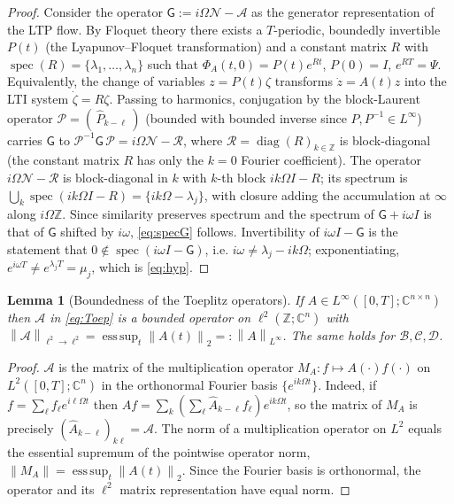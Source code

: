 \documentclass{amsart}
\newtheorem{lemma}{Lemma}
\theoremstyle{definition}
\DeclareMathOperator{\spec}{spec}
\DeclareMathOperator{\diag}{diag}
\newcommand{\C}{\mathbb{C}}
\newcommand{\Z}{\mathbb{Z}}
\newcommand{\norm}[1]{\left\lVert#1\right\rVert}
\newcommand{\Acal}{\mathcal{A}}
\newcommand{\Bcal}{\mathcal{B}}
\newcommand{\Ccal}{\mathcal{C}}
\newcommand{\Dcal}{\mathcal{D}}
\newcommand{\Ncal}{\mathcal{N}}
\begin{document}
\begin{proof}
Consider the operator $\mathsf G:=i\Omega\Ncal-\Acal$ as the generator
representation of the LTP flow. By Floquet theory there exists a $T$-periodic,
boundedly invertible $P(t)$ (the Lyapunov–Floquet transformation) and a
constant matrix $R$ with $\spec(R)=\{\lambda_1,\dots,\lambda_n\}$ such that
$\Phi_A(t,0)=P(t)e^{Rt}$, $P(0)=I$, $e^{RT}=\Psi$. Equivalently, the change of
variables $z=P(t)\zeta$ transforms $\dot z=A(t)z$ into the LTI system
$\dot\zeta=R\zeta$. Passing to harmonics, conjugation by the block-Laurent
operator $\mathcal P=(\,\hat P_{k-\ell}\,)$ (bounded with bounded inverse since
$P,P^{-1}\in L^\infty$) carries $\mathsf G$ to
$\mathcal P^{-1}\mathsf G\,\mathcal P=i\Omega\Ncal-\mathcal R$, where
$\mathcal R=\diag(R)_{k\in\Z}$ is block-diagonal (the constant matrix $R$ has
only the $k=0$ Fourier coefficient). The operator $i\Omega\Ncal-\mathcal R$ is
block-diagonal in $k$ with $k$-th block $ik\Omega I-R$; its spectrum is
$\bigcup_k\spec(ik\Omega I-R)=\{ik\Omega-\lambda_j\}$, with closure adding the
accumulation at $\infty$ along $i\Omega\Z$. Since similarity preserves spectrum
and the spectrum of $\mathsf G+i\omega I$ is that of $\mathsf G$ shifted by
$i\omega$, \eqref{eq:specG} follows. Invertibility of
$i\omega I-\mathsf G$ is the statement that $0\notin\spec(i\omega I-\mathsf G)$,
i.e. $i\omega\ne\lambda_j-ik\Omega$; exponentiating, $e^{i\omega T}\ne
e^{\lambda_j T}=\mu_j$, which is \eqref{eq:hyp}.
\end{proof}

\begin{lemma}[Boundedness of the Toeplitz operators]\label{lem:bounded}
If $A\in L^\infty([0,T];\C^{n\times n})$ then $\Acal$ in \eqref{eq:Toep} is a
bounded operator on $\ell^2(\Z;\C^n)$ with
$\norm{\Acal}_{\ell^2\to\ell^2}=\operatorname*{ess\,sup}_{t}\norm{A(t)}_2
=:\norm{A}_{L^\infty}$. The same holds for $\Bcal,\Ccal,\Dcal$.
\end{lemma}

\begin{proof}
$\Acal$ is the matrix of the multiplication operator
$M_A:f\mapsto A(\cdot)f(\cdot)$ on $L^2([0,T];\C^n)$ in the orthonormal Fourier
basis $\{e^{ik\Omega t}\}$. Indeed, if $f=\sum_\ell f_\ell e^{i\ell\Omega t}$
then $Af=\sum_k(\sum_\ell\hat A_{k-\ell}f_\ell)e^{ik\Omega t}$, so the matrix of
$M_A$ is precisely $(\hat A_{k-\ell})_{k\ell}=\Acal$. The norm of a
multiplication operator on $L^2$ equals the essential supremum of the pointwise
operator norm, $\norm{M_A}=\operatorname*{ess\,sup}_t\norm{A(t)}_2$. Since the
Fourier basis is orthonormal, the operator and its $\ell^2$ matrix
representation have equal norm.
\end{proof}
\end{document}
